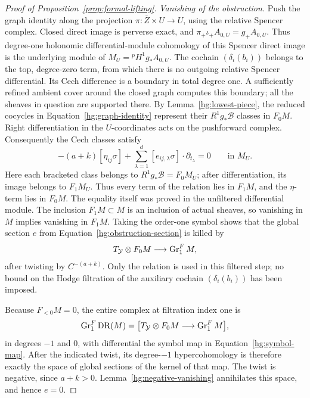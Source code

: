 \begin{proof}[Proof of Proposition~\ref{prop:formal-lifting}]
\smallskip\noindent\emph{Vanishing of the obstruction.}
Push the graph identity along the projection
\(\pi:\overline Z\times U\to U\), using the relative Spencer
complex.  Closed direct image is perverse exact, and
\(\pi_+\iota_+A_{0,U}=g_+A_{0,U}\).  Thus degree-one holonomic
differential-module cohomology of this Spencer direct image is
the underlying module of
\(M_U={}^{p}\!H^1g_*A_{0,U}\).
The cochain \((\delta_i(b_i))\) belongs to the top, degree-zero
term, from which there is no outgoing relative Spencer
differential.  Its Cech difference is a boundary in total
degree one.  A sufficiently refined ambient cover around
the closed graph computes this boundary; all the sheaves
in question are supported there.  By
Lemma~\ref{hg:lowest-piece}, the reduced cocycles in
Equation~\eqref{hg:graph-identity} represent their
\(R^1g_*\mathcal B\) classes in \(F_0M\).  Right
differentiation in the \(U\)-coordinates acts on the
pushforward complex.  Consequently the Cech classes satisfy
\[
 -(a+k)[\eta_{ij}\sigma]
 +\sum_{\lambda=1}^d
       [e_{ij,\lambda}\sigma]\cdot\partial_{t_\lambda}=0
 \qquad\text{in }M_U.
\]
Here each bracketed class belongs to
\(R^1g_*\mathcal B=F_0M_U\); after differentiation, its
image belongs to \(F_1M_U\).  Thus every term of the relation
lies in \(F_1M\), and the \(\eta\)-term lies in \(F_0M\).
The equality itself was proved in the unfiltered differential
module.  The inclusion \(F_1M\subset M\)
is an inclusion of actual sheaves, so vanishing in \(M\)
implies vanishing in \(F_1M\).  Taking the order-one symbol
shows that the global section \(e\) from
Equation~\eqref{hg:obstruction-section} is killed by
\begin{equation}\label{hg:symbol-map}
 T_{\mathcal Y}\otimes F_0M
           \longrightarrow \operatorname{Gr}^F_1M,
\end{equation}
after twisting by \(C^{-(a+k)}\).
Only the relation is used in this filtered step; no bound
on the Hodge filtration of the auxiliary cochain \((\delta_i(b_i))\)
has been imposed.

Because \(F_{<0}M=0\), the entire complex at filtration
index one is
\[
 \operatorname{Gr}^F_1\operatorname{DR}(M)=
 \bigl[T_{\mathcal Y}\otimes F_0M
       \longrightarrow\operatorname{Gr}^F_1M\bigr],
\]
in degrees \(-1\) and \(0\), with differential the symbol
map in Equation~\eqref{hg:symbol-map}.  After the indicated
twist, its degree-\(-1\) hypercohomology is therefore exactly
the space of global sections of the kernel of that map.
The twist is negative,
since \(a+k>0\).  Lemma~\ref{hg:negative-vanishing}
annihilates this space, and hence \(e=0\).


\end{proof}
